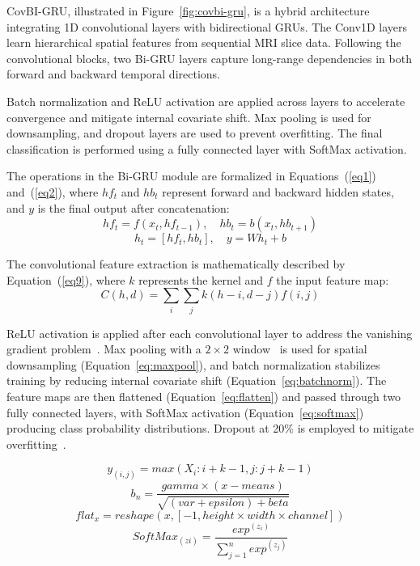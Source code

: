\documentclass[a4paper,fleqn]{cas-sc}
\begin{document}
 

CovBI-GRU, illustrated in Figure~\ref{fig:covbi-gru}, is a hybrid architecture integrating 1D convolutional layers with bidirectional GRUs. The Conv1D layers learn hierarchical spatial features from sequential MRI slice data. Following the convolutional blocks, two Bi-GRU layers capture long-range dependencies in both forward and backward temporal directions.

Batch normalization and ReLU activation are applied across layers to accelerate convergence and mitigate internal covariate shift. Max pooling is used for downsampling, and dropout layers are used to prevent overfitting. The final classification is performed using a fully connected layer with SoftMax activation.

The operations in the Bi-GRU module are formalized in Equations~(\ref{eq1}) and~(\ref{eq2}), where $hf_t$ and $hb_t$ represent forward and backward hidden states, and $y$ is the final output after concatenation:
\begin{equation}
    hf_t = f(x_t, hf_{t-1}), \quad hb_t = b(x_t, hb_{t+1})
    \label{eq1}
\end{equation}
\begin{equation}
    h_t = [hf_t, hb_t], \quad y = W h_t + b
    \label{eq2}
\end{equation}

The convolutional feature extraction is mathematically described by Equation~(\ref{eq9}), where $k$ represents the kernel and $f$ the input feature map:
\begin{equation}
    C(h,d) = \sum_i \sum_j k(h-i,d-j) f(i,j)
    \label{eq9}
\end{equation}

ReLU activation is applied after each convolutional layer to address the vanishing gradient problem~\cite{R45}. Max pooling with a $2\times2$ window~\cite{R46} is used for spatial downsampling (Equation~\ref{eq:maxpool}), and batch normalization stabilizes training by reducing internal covariate shift (Equation~\ref{eq:batchnorm}). The feature maps are then flattened (Equation~\ref{eq:flatten}) and passed through two fully connected layers, with SoftMax activation (Equation~\ref{eq:softmax}) producing class probability distributions. Dropout at 20\% is employed to mitigate overfitting~\cite{R47}.

\begin{equation}
      y_{(i,j)} = max (X_i : i+k-1, j : j+k-1)
      \label{eq:maxpool}
\end{equation}
\begin{equation}
    b_n = \frac{gamma \times (x - means)}{\sqrt {(var + epsilon) + beta}}
    \label{eq:batchnorm}
\end{equation}
\begin{equation}
    flat_x = reshape (x, [-1, height \times width \times channel])
    \label{eq:flatten}
\end{equation}
\begin{equation}
    SoftMax_{(zi)} = \frac {exp^{(z_i)}} {\sum_{j=1}^{n} exp^{(z_j)}}
    \label{eq:softmax}
\end{equation}
\end{document}
